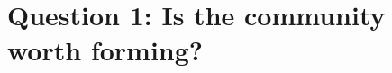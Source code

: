 \documentclass[11pt,a4paper]{article}
\begin{document}
\section{Question 1: Is the community worth forming?}
\setcounter{subsection}{4}

\end{document}
